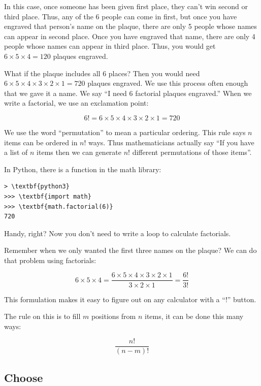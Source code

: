 In this case, once someone has been given first place, they can't win
second or third place. Thus, any of the 6 people can come in first,
but once you have engraved that person's name on the plaque, there are
only 5 people whose names can appear in second place. Once you have
engraved that name, there are only 4 people whose names can appear in
third place. Thus, you would get $6 \times 5 \times 4 = 120$ plaques
engraved.

What if the plaque includes all 6 places?  Then you would need $6 \times 5
\times 4 \times 3 \times 2 \times 1 = 720$ plaques engraved.  We use
this process often enough that we gave it a name.  We say ``I need 6
factorial plaques engraved.''  When we write a factorial, we use an
exclamation point:

$$6! = 6 \times 5 \times 4 \times 3 \times 2 \times 1 = 720$$

We use the word ``permutation'' to mean a particular ordering.
This rule says $n$ items can be ordered in $n!$ ways. Thus
mathematicians actually say ``If you have a list of $n$ items then we
can generate $n!$ different permutations of those items''.

In Python, there is a  function in the math library:
\begin{Verbatim}[commandchars=\\\{\}]
> \textbf{python3} 
>>> \textbf{import math}
>>> \textbf{math.factorial(6)}
720
\end{Verbatim}

Handy, right? Now you don't need to write a loop to calculate factorials.

Remember when we only wanted the first three names on the plaque? We can do that problem using factorials:

$$6 \times 5 \times 4 = \frac{6 \times 5 \times 4 \times 3 \times 2 \times 1}{3 \times 2 \times 1} = \frac{6!}{3!}$$

This formulation makes it easy to figure out on any calculator with a ``!'' button.

The rule on this is to fill $m$ positions from $n$ items, it can be done this many ways:

$$\frac{n!}{(n-m)!}$$

\subsection{Choose}


